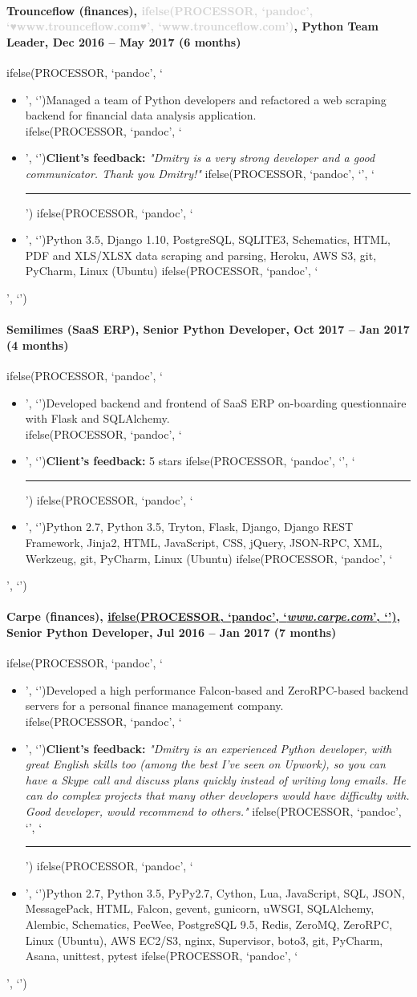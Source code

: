 \documentclass[a4paper,8pt]{extarticle}
\newcommand{\chref}[2]{\href{#1}
{ifelse(PROCESSOR, `pandoc', `#2', `\underline{\smash{#2}}')}}
\newcommand{\itchref}[2]{\chref{#1}{\textit{#2}}}  %
\newcommand{\chrule}{ifelse(PROCESSOR, `pandoc', `', `\vspace{3pt}\hrule')}
\newcommand{\brokenhreflg}[1]{\textcolor{lightgray}{ifelse(PROCESSOR, `pandoc', `♥#1♥', `#1')}}
\newcommand{\pdbeginitemize}{ifelse(PROCESSOR, `pandoc', `\begin{itemize}', `')}
\newcommand{\pditem}{ifelse(PROCESSOR, `pandoc', `\item', `')}
\newcommand{\pdenditemize}{ifelse(PROCESSOR, `pandoc', `\end{itemize}', `')}
\begin{document}
\paragraph*{Trounceflow (finances), \brokenhreflg{www.trounceflow.com}, Python Team Leader, Dec 2016 -- May 2017 (6 months)}
\pdbeginitemize
\pditem Managed a team of Python developers and refactored a web scraping backend for financial data analysis application.\\
\pditem \textbf{Client's feedback:} \textit{"Dmitry is a very strong developer and a good communicator. Thank you Dmitry!"}
\chrule
\pditem Python 3.5, Django 1.10, PostgreSQL, SQLITE3, Schematics, HTML, PDF and XLS/XLSX data scraping and parsing, Heroku, AWS S3, git, PyCharm, Linux (Ubuntu)
\pdenditemize

\paragraph*{Semilimes (SaaS ERP), Senior Python Developer, Oct 2017 -- Jan 2017 (4 months)}
\pdbeginitemize
\pditem Developed backend and frontend of SaaS ERP on-boarding questionnaire with Flask and SQLAlchemy.\\
\pditem \textbf{Client's feedback:} 5 stars
\chrule
\pditem Python 2.7, Python 3.5, Tryton, Flask, Django, Django REST Framework, Jinja2, HTML, JavaScript, CSS, jQuery, JSON-RPC, XML, Werkzeug, git, PyCharm, Linux (Ubuntu)
\pdenditemize

\paragraph*{Carpe (finances), \itchref{https://www.carpe.com}{www.carpe.com}, Senior Python Developer, Jul 2016 -- Jan 2017 (7 months)}
\pdbeginitemize
\pditem Developed a high performance Falcon-based and ZeroRPC-based backend servers for a personal finance management company.\\
\pditem \textbf{Client's feedback:} \textit{"Dmitry is an experienced Python developer, with great English skills too (among the best I've seen on Upwork), so you can have a Skype call and discuss plans quickly instead of writing long emails. He can do complex projects that many other developers would have difficulty with. Good developer, would recommend to others."}
\chrule
\pditem Python 2.7, Python 3.5, PyPy2.7, Cython, Lua, JavaScript, SQL, JSON, MessagePack, HTML, Falcon, gevent, gunicorn, uWSGI, SQLAlchemy, Alembic, Schematics, PeeWee, PostgreSQL 9.5, Redis, ZeroMQ, ZeroRPC, Linux (Ubuntu), AWS EC2/S3, nginx, Supervisor, boto3, git, PyCharm, Asana, unittest, pytest
\pdenditemize
\end{document}
